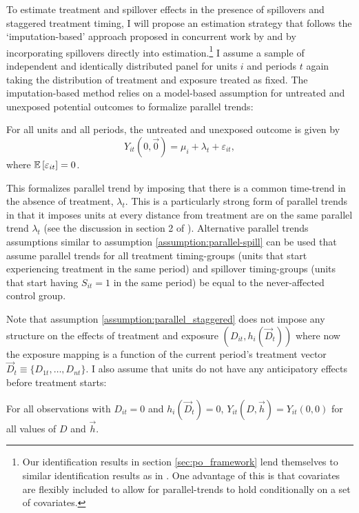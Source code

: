 \documentclass[11pt]{article}
\begin{document}
To estimate treatment and spillover effects in the presence of spillovers and staggered treatment timing, I will propose an estimation strategy that follows the `imputation-based' approach proposed in concurrent work by \citet{Gardner_2021} and \citet{Borusyak_Jaravel_Spiess_2021} by incorporating spillovers directly into estimation.\footnote{Our identification results in section \ref{sec:po_framework} lend themselves to similar identification results as in \citet{Callaway_SantAnna_2020}. One advantage of this is that covariates are flexibly included to allow for parallel-trends to hold conditionally on a set of covariates.} I assume a sample of independent and identically distributed panel for units $i$ and periods $t$ again taking the distribution of treatment and exposure treated as fixed. The imputation-based method relies on a model-based assumption for untreated and unexposed potential outcomes to formalize parallel trends:
\begin{assumption}\label{assumption:parallel_staggered}
    For all units and all periods, the untreated and unexposed outcome is given by
    \begin{equation}\label{eq:y0_staggered}
        Y_{it}(0, \vec{0}) = \mu_i + \lambda_t + \varepsilon_{it},
    \end{equation}
    where $\mathbb{E}\left[\varepsilon_{it}\right] = 0$.
\end{assumption}
This formalizes parallel trend by imposing that there is a common time-trend in the absence of treatment, $\lambda_t$. This is a particularly strong form of parallel trends in that it imposes units at every distance from treatment are on the same parallel trend $\lambda_t$ (see the discussion in section 2 of \citet{Borusyak_Jaravel_Spiess_2021}). Alternative parallel trends assumptions similar to assumption \ref{assumption:parallel-spill} can be used that assume parallel trends for all treatment timing-groups (units that start experiencing treatment in the same period) and spillover timing-groups (units that start having $S_{it} = 1$ in the same period) be equal to the never-affected control group. 

Note that assumption \ref{assumption:parallel_staggered} does not impose any structure on the effects of treatment and exposure $(D_{it}, h_i(\vec{D}_t))$ where now the exposure mapping is a function of the current period's treatment vector $\vec{D}_t \equiv \{D_{1t}, \dots, D_{nt} \}$. I also assume that units do not have any anticipatory effects before treatment starts:
\begin{assumption}\label{assumption:no-anticipation_staggered}
    For all observations with $D_{it} = 0$ and $h_i(\vec{D}_t) = 0$, $Y_{it}(D, \vec{h}) = Y_{it}(0,0)$ for all values of $D$ and $\vec{h}$.
\end{assumption}
\end{document}
